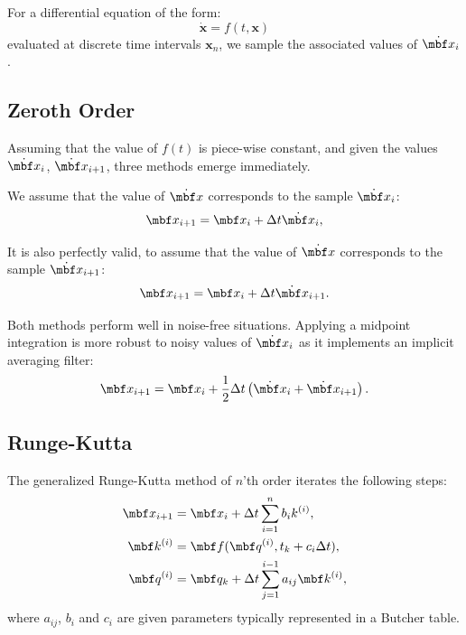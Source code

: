 \documentclass[10pt,a4paper]{article}
\numberwithin{equation}{section}
\begin{document}
For a differential equation of the form:
\begin{equation}
\dot{\textbf{x}} = f(t, \textbf{x})
\end{equation}
evaluated at discrete time intervals $\textbf{x}_n$, we sample the associated values of $\dot{\mbf x}_i$.

\subsection{Zeroth Order}
Assuming that the value of $f(t)$ is piece-wise constant, and given the values $\dot{\mbf x}_i$, $\dot{\mbf x}_{i+1}$, three methods emerge immediately.

We assume that the value of $\dot{\mbf x}$ corresponds to the sample $\dot{\mbf x}_i$:
\begin{equation}
\mbf x_{i+1} = \mbf x_{i} + \Delta t \dot{\mbf x}_i,
\label{eq:first_order_forward}
\end{equation}

It is also perfectly valid, to assume that the value of $\dot{\mbf x}$ corresponds to the sample $\dot{\mbf x}_{i+1}$:
\begin{equation}
\mbf x_{i+1} = \mbf x_{i} + \Delta t \dot{\mbf x}_{i+1}.
\label{eq:first_order_backward}
\end{equation}

Both methods perform well in noise-free situations. Applying a midpoint integration is more robust to noisy values of $\dot{\mbf x}_i$ as it implements an implicit averaging filter:
\begin{equation}
\mbf x_{i+1} = \mbf x_{i} + \dfrac{1}{2}\Delta t \left( \dot{\mbf x}_{i} + \dot{\mbf x}_{i+1} \right).
\label{eq:first_order_midward}
\end{equation}


\subsection{Runge-Kutta}
\label{sec:runge-kutta}
The generalized Runge-Kutta method of $n$'th order iterates the following steps:
\begin{align}
\mbf x_{i+1} & = \mbf x_{i} + \Delta t \sum_{i = 1}^{n} b_i k^{(i)}, \\ 
\mbf k^{(i)} & = \mbf f(\mbf q^{(i)}, t_k + c_i \Delta t), \\
\mbf q^{(i)} & = \mbf q_k + \Delta t \sum_{j = 1}^{i - 1}a_{ij}\mbf k^{(i)},
\end{align}
where $a_{ij}$, $b_i$ and $c_i$ are given parameters typically represented in a Butcher table.
\end{document}
